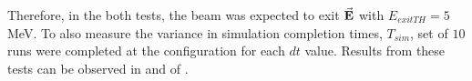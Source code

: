 \documentclass[a4paper,oneside,12pt]{report}
\numberwithin{equation}{chapter}
\begin{document}
Therefore, in the both tests, the beam was expected to exit $\vec{\textbf{E}}$ with $E_{exitTH} = 5$ MeV. 
To also measure the variance in simulation completion times, $T_{sim}$, set of $10$ runs were completed at the configuration for each $dt$ value.
Results from these tests can be observed in  and  of .

\end{document}
